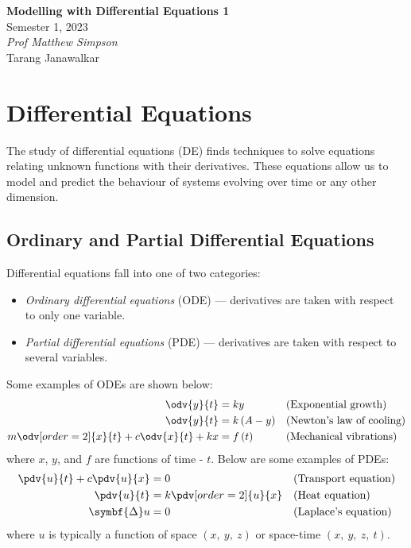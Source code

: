 \documentclass{article}
\date{}
\newcommand{\unitName}{Modelling with Differential Equations 1}
\newcommand{\unitTime}{Semester 1, 2023}
\newcommand{\unitCoordinator}{Prof Matthew Simpson}
\newcommand{\documentAuthors}{Tarang Janawalkar}
\begin{document}
%
\begin{titlepage}
    \vspace*{\fill}
    \begin{center}
        \LARGE{\textbf{\unitName}} \\[0.1in]
        \normalsize{\unitTime} \\[0.2in]
        \normalsize\textit{\unitCoordinator} \\[0.2in]
        \documentAuthors
    \end{center}
    \vspace*{\fill}
    \doclicenseThis
    \thispagestyle{empty}
\end{titlepage}
\newpage
%
\tableofcontents
\newpage
%
\section{Differential Equations}
The study of differential equations (DE) finds techniques to solve equations relating unknown functions with their derivatives.
These equations allow us to model and predict the behaviour of systems evolving over time or any other dimension.
\subsection{Ordinary and Partial Differential Equations}
Differential equations fall into one of two categories:
\begin{itemize}
    \item \emph{Ordinary differential equations} (ODE) --- derivatives are taken with respect to only one variable.
    \item \emph{Partial differential equations} (PDE) --- derivatives are taken with respect to several variables.
\end{itemize}
Some examples of ODEs are shown below:
\begin{align*}
    \odv{y}{t}                                & = ky                    &  & (\text{Exponential growth})      \\
    \odv{y}{t}                                & = k\left( A - y \right) &  & (\text{Newton's law of cooling}) \\
    m \odv[order=2]{x}{t} + c \odv{x}{t} + kx & = f\left( t \right)     &  & (\text{Mechanical vibrations})
\end{align*}
where \(x\), \(y\), and \(f\) are functions of time - \(t\).
Below are some examples of PDEs:
\begin{align*}
    \pdv{u}{t} + c \pdv{u}{x} & = 0                    &  & (\text{Transport equation}) \\
    \pdv{u}{t}                & = k\pdv[order=2]{u}{x} &  & (\text{Heat equation})      \\
    \symbf{\Delta}u           & = 0                    &  & (\text{Laplace's equation})
\end{align*}
where \(u\) is typically a function of space \(\left( x,\: y,\: z \right)\) or space-time \(\left( x,\: y,\: z,\: t \right)\).
\end{document}
